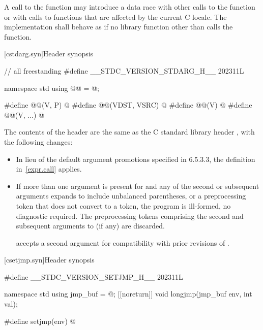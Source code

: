 \pnum
A call to the  function
may introduce a data race with other
calls to the  function or with calls to functions that are
affected by the current C locale. The implementation shall behave as if no
library function other than  calls the 
function.

[cstdarg.syn]{Header  synopsis}

%
\begin{codeblock}
// all freestanding
#define __STDC_VERSION_STDARG_H__ 202311L

namespace std {
  using @@ = @\seebelow@;
}

#define @@(V, P) @\seebelow@
#define @@(VDST, VSRC) @\seebelow@
#define @@(V) @\seebelow@
#define @@(V, ...) @\seebelow@
\end{codeblock}

\pnum
The contents of the header  are the same as the C
standard library header , with the following changes:
\begin{itemize}
\item
In lieu of the default argument promotions specified in \IsoC{} 6.5.3.3,
the definition in~\ref{expr.call} applies.
\item
If more than one argument is present for  and
any of the second or subsequent arguments
expands to include unbalanced parentheses, or
a preprocessing token that does not convert to a token,
the program is ill-formed, no diagnostic required.
The preprocessing tokens
comprising the second and subsequent arguments to  (if any)
are discarded.
\begin{note}
 accepts a second argument
for compatibility with prior revisions of \Cpp{}.
\end{note}
\end{itemize}


[csetjmp.syn]{Header  synopsis}

%
%
%
\begin{codeblock}
#define __STDC_VERSION_SETJMP_H__ 202311L

namespace std {
  using jmp_buf = @\seebelow@;
  [[noreturn]] void longjmp(jmp_buf env, int val);
}

#define setjmp(env) @\seebelow@
\end{codeblock}


